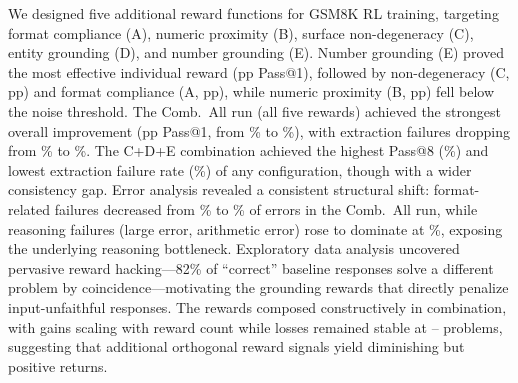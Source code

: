 We designed five additional reward functions for GSM8K RL training, targeting format compliance (A), numeric proximity (B), surface non-degeneracy (C), entity grounding (D), and number grounding (E).
Number grounding (E) proved the most effective individual reward (\pFourSeparateEDeltaPassOne{}pp Pass@1), followed by non-degeneracy (C, \pFourSeparateCDeltaPassOne{}pp) and format compliance (A, \pFourSeparateADeltaPassOne{}pp), while numeric proximity (B, \pFourSeparateBDeltaPassOne{}pp) fell below the noise threshold.
The Comb.\ All run (all five rewards) achieved the strongest overall improvement (\pFourCombinedAllDeltaPassOne{}pp Pass@1, from \pFourBaselinePassOne\% to \pFourCombinedAllPassOne\%), with extraction failures dropping from \pFourBaselineExtrFail\% to \pFourCombinedAllExtrFail\%.
The C+D+E combination achieved the highest Pass@8 (\pFourCombinedCdePassEight\%) and lowest extraction failure rate (\pFourCombinedCdeExtrFail\%) of any configuration, though with a wider consistency gap.
Error analysis revealed a consistent structural shift: format-related failures decreased from \pFourBaselineFmtFailPct\% to \pFourCombinedAllFmtFailPct\% of errors in the Comb.\ All run, while reasoning failures (large error, arithmetic error) rose to dominate at \pFourCombinedAllReasonPct\%, exposing the underlying reasoning bottleneck.
Exploratory data analysis uncovered pervasive reward hacking---82\% of ``correct'' baseline responses solve a different problem by coincidence---motivating the grounding rewards that directly penalize input-unfaithful responses.
The rewards composed constructively in combination, with gains scaling with reward count while losses remained stable at \pFourLossMin--\pFourLossMax{} problems, suggesting that additional orthogonal reward signals yield diminishing but positive returns.
